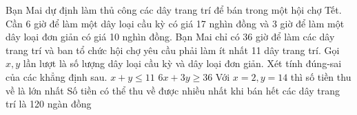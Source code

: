 \begin{ex}
 Bạn Mai dự định làm thủ công các dây trang trí để bán trong một hội chợ Tết. Cần 6 giờ để làm một dây loại cầu kỳ có giá 17 nghìn đồng và 3 giờ để làm một dây loại đơn giản có giá 10 nghìn đồng. Bạn Mai chỉ có 36 giờ để làm các dây trang trí và ban tổ chức hội chợ yêu cầu phải làm ít nhất 11 dây trang trí. Gọi ${x,y}$ lần lượt là số lượng dây loại cầu kỳ và dây loại đơn giản. Xét tính đúng-sai của các khẳng định sau. 
\choiceTFt
{  $x+y \le 11$ }
   {  $6x+3y \ge 36$ }
     { Với $x = 2, y = 14$ thì số tiền thu về là lớn nhất }
    { \True  Số tiền có thể thu về được nhiều nhất khi bán hết các dây trang trí là 120 ngàn đồng }
\end{ex}

